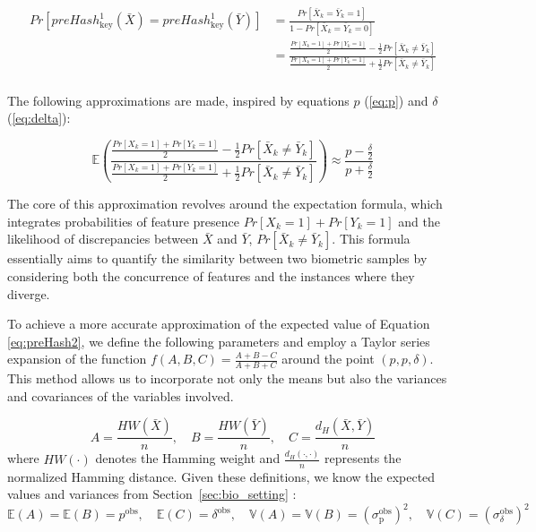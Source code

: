 \begin{equation} \label{eq:preHash2}
    \begin{aligned}
        Pr[preHash_{\text{key}}^1(\bar{X}) = preHash_{\text{key}}^1(\bar{Y})] &= \frac{Pr[\bar{X}_k = \bar{Y}_k = 1]}{1 - Pr[\bar{X}_k = \bar{Y}_k = 0]}\\
        &= \frac{\frac{Pr[X_k = 1] + Pr[Y_k = 1]}{2} - \frac{1}{2}Pr[\bar{X}_k \neq \bar{Y}_k]}{\frac{Pr[X_k = 1] + Pr[Y_k = 1]}{2} + \frac{1}{2}Pr[\bar{X}_k \neq \bar{Y}_k]}\\
    \end{aligned}
\end{equation}

The following approximations are made, inspired by equations \(p\) (\ref{eq:p}) and $\delta$ (\ref{eq:delta}):

\begin{equation}
    \mathbb{E}\left(\frac{\frac{Pr[X_k = 1] + Pr[Y_k = 1]}{2} - \frac{1}{2}Pr[\bar{X}_k \neq \bar{Y}_k]}{\frac{Pr[X_k = 1] + Pr[Y_k = 1]}{2} + \frac{1}{2}Pr[\bar{X}_k \neq \bar{Y}_k]}\right) \approx \frac{p - \frac{\delta}{2}}{p + \frac{\delta}{2}}
\end{equation}

The core of this approximation revolves around the expectation formula, which integrates probabilities of feature presence \(Pr[X_k=1]+Pr[Y_k=1]\) and the likelihood of discrepancies between \(\bar{X}\) and \(\bar{Y}\), \(Pr[\bar{X}_k \neq \bar{Y}_k]\). This formula essentially aims to quantify the similarity between two biometric samples by considering both the concurrence of features and the instances where they diverge.

To achieve a more accurate approximation of the expected value of Equation \ref{eq:preHash2}, we define the following parameters and employ a Taylor series expansion of the function \(f(A,B,C) = \frac{A + B - C}{A + B + C}\) around the point \((p, p, \delta)\). This method allows us to incorporate not only the means but also the variances and covariances of the variables involved.

\[
A = \frac{HW(\bar{X})}{n}, \quad B = \frac{HW(\bar{Y})}{n}, \quad C = \frac{d_H(\bar{X}, \bar{Y})}{n}
\]
where \(HW(\cdot)\) denotes the Hamming weight and \(\frac{d_H(\cdot, \cdot)}{n}\) represents the normalized Hamming distance. Given these definitions, we know the expected values and variances from Section~\ref{sec:bio_setting} :
\[
    \mathbb{E}(A) = \mathbb{E}(B) = p^{\text{obs}}, \quad \mathbb{E}(C) = \delta^{\text{obs}}, \quad \mathbb{V}(A) = \mathbb{V}(B) = (\sigma^{\text{obs}}_{\text{p}})^2, \quad \mathbb{V}(C) = ({\sigma^{\text{obs}}_{\delta}})^2
\]

